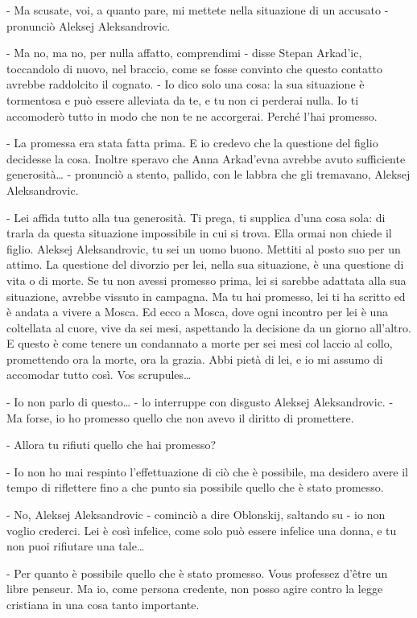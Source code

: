 - Ma scusate, voi, a quanto pare, mi mettete nella situazione di un accusato - pronunciò Aleksej Aleksandrovic. 

- Ma no, ma no, per nulla affatto, comprendimi - disse Stepan Arkad'ic, toccandolo di nuovo, nel braccio, come se fosse convinto che questo contatto avrebbe raddolcito il cognato. - Io dico solo una cosa: la sua situazione è tormentosa e può essere alleviata da te, e tu non ci perderai nulla. Io ti accomoderò tutto in modo che non te ne accorgerai. Perché l'hai promesso. 

- La promessa era stata fatta prima. E io credevo che la questione del figlio decidesse la cosa. Inoltre speravo che Anna Arkad'evna avrebbe avuto sufficiente generosità\ldots{} - pronunciò a stento, pallido, con le labbra che gli tremavano, Aleksej Aleksandrovic. 

- Lei affida tutto alla tua generosità. Ti prega, ti supplica d'una cosa sola: di trarla da questa situazione impossibile in cui si trova. Ella ormai non chiede il figlio. Aleksej Aleksandrovic, tu sei un uomo buono. Mettiti al posto suo per un attimo. La questione del divorzio per lei, nella sua situazione, è una questione di vita o di morte. Se tu non avessi promesso prima, lei si sarebbe adattata alla sua situazione, avrebbe vissuto in campagna. Ma tu hai promesso, lei ti ha scritto ed è andata a vivere a Mosca. Ed ecco a Mosca, dove ogni incontro per lei è una coltellata al cuore, vive da sei mesi, aspettando la decisione da un giorno all'altro. E questo è come tenere un condannato a morte per sei mesi col laccio al collo, promettendo ora la morte, ora la grazia. Abbi pietà di lei, e io mi assumo di accomodar tutto così. Vos scrupules\ldots{} 

- Io non parlo di questo\ldots{} - lo interruppe con disgusto Aleksej Aleksandrovic. - Ma forse, io ho promesso quello che non avevo il diritto di promettere. 

- Allora tu rifiuti quello che hai promesso? 

- Io non ho mai respinto l'effettuazione di ciò che è possibile, ma desidero avere il tempo di riflettere fino a che punto sia possibile quello che è stato promesso. 

- No, Aleksej Aleksandrovic - cominciò a dire Oblonskij, saltando su - io non voglio crederci. Lei è così infelice, come solo può essere infelice una donna, e tu non puoi rifiutare una tale\ldots{} 

- Per quanto è possibile quello che è stato promesso. Vous professez d'être un libre penseur. Ma io, come persona credente, non posso agire contro la legge cristiana in una cosa tanto importante. 

